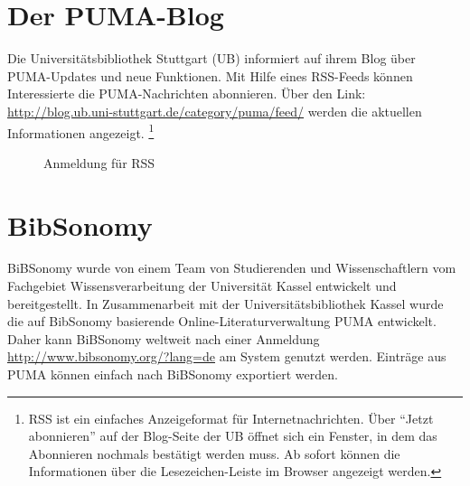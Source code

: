 \section{Der PUMA-Blog}
\label{sec:pumaBlog}
Die Universitätsbibliothek Stuttgart (UB) informiert auf ihrem Blog über PUMA-Updates und neue Funktionen. Mit Hilfe eines RSS-Feeds können Interessierte die PUMA-Nachrichten abonnieren. Über den Link: \newline \url{http://blog.ub.uni-stuttgart.de/category/puma/feed/} werden die aktuellen Informationen angezeigt. \footnote{RSS ist ein einfaches Anzeigeformat für Internetnachrichten. Über \enquote{Jetzt abonnieren} auf der Blog-Seite der UB öffnet sich ein Fenster, in dem das Abonnieren nochmals bestätigt werden muss. Ab sofort können die Informationen über die Lesezeichen-Leiste im Browser angezeigt werden.}
 \begin{figure}[h!]
 \centering
 \caption{Anmeldung für RSS}
 \label{fig:anmeldungRss}
\end{figure} 
\section{BibSonomy}
\label{sec:bibsonomy}
BiBSonomy wurde von einem Team von Studierenden und Wissenschaftlern vom Fachgebiet Wissensverarbeitung der Universität Kassel entwickelt und bereitgestellt. In Zusammenarbeit mit der Universitätsbibliothek Kassel wurde die auf BibSonomy basierende Online-Literaturverwaltung PUMA entwickelt. Daher kann BiBSonomy weltweit nach einer Anmeldung \newline \url{http://www.bibsonomy.org/?lang=de} am System genutzt werden. Einträge aus PUMA können einfach nach BiBSonomy exportiert werden.

